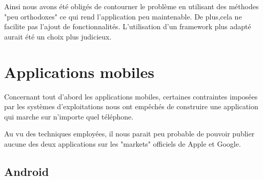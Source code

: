 Ainsi nous avons été obligés de contourner le problème en utilisant des méthodes "peu orthodoxes" ce qui rend l'application peu maintenable.
De plus,cela ne facilite pas l'ajout de fonctionnalités.
L'utilisation d'un framework plus adapté aurait été un choix plus judicieux.






\section{Applications mobiles}

Concernant tout d'abord les applications mobiles, certaines contraintes imposées par les systèmes d'exploitations nous ont empêchés de construire une application qui marche sur n'importe quel téléphone.

Au vu des techniques employées, il nous parait peu probable de pouvoir publier aucune des
deux applications sur les "markets" officiels de Apple et Google.




\subsection{Android}



